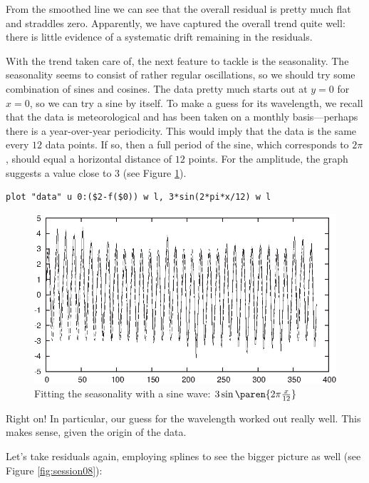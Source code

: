 From the smoothed line we can see that the overall residual is pretty
much flat and straddles zero. Apparently, we have captured the overall
trend quite well: there is little evidence of a systematic drift
remaining in the residuals.

With the trend taken care of, the next feature to tackle is the
seasonality.  The seasonality seems to consist of rather regular
oscillations, so we should try some combination of sines and cosines.
The data pretty much starts out at $y=0$ for $x=0$, so we can try a
sine by itself. To make a guess for its wavelength, we recall that the
data is meteorological and has been taken on a monthly basis---perhaps
there is a year-over-year periodicity. This would imply that the data
is the same every $12$ data points. If so, then a full period of the
sine, which corresponds to $2\pi$, should equal a horizontal distance
of $12$ points. For the amplitude, the graph suggests a value close to
$3$ (see Figure \ref{fig:session07}).

\begin{verbatim}
plot "data" u 0:($2-f($0)) w l, 3*sin(2*pi*x/12) w l
\end{verbatim}

\begin{figure}[t!]
  \centerline{\includegraphics{img/session07}}
  \caption{Fitting the seasonality with a sine wave: 
    $3 \sin\paren{2\pi \frac{x}{12}}$}
  \label{fig:session07}\vspace*{-6pt}
\end{figure}
  
Right on! In particular, our guess for the wavelength worked out
really well. This makes sense, given the origin of the data.
    
Let's take residuals again, employing splines to see the bigger
picture as well (see Figure \ref{fig:session08}):

